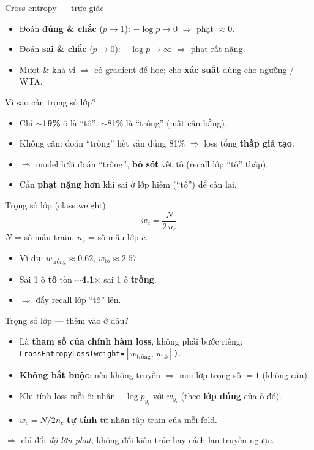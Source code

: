 \documentclass{beamer}
\newcommand{\hl}[1]{\textbf{#1}}
\begin{document}
\begin{frame}{Cross-entropy --- trực giác}
\begin{itemize}
    \item Đoán \hl{đúng \& chắc} ($p\!\to\!1$): $-\log p \to 0$ $\Rightarrow$ phạt $\approx 0$.
    \item Đoán \hl{sai \& chắc} ($p\!\to\!0$): $-\log p \to \infty$ $\Rightarrow$ phạt rất nặng.
    \item Mượt \& khả vi $\Rightarrow$ có gradient để học; cho \hl{xác suất} dùng cho ngưỡng / WTA.
\end{itemize}
\end{frame}

\begin{frame}{Vì sao cần trọng số lớp?}
\begin{itemize}
    \item Chỉ $\sim$\hl{19\%} ô là ``tô'', $\sim$81\% là ``trống'' (mất cân bằng).
    \item Không cân: đoán ``trống'' hết vẫn đúng 81\% $\Rightarrow$ loss tổng \hl{thấp giả tạo}.
    \item $\Rightarrow$ model lười đoán ``trống'', \hl{bỏ sót} vết tô (recall lớp ``tô'' thấp).
    \item Cần \hl{phạt nặng hơn} khi sai ở lớp hiếm (``tô'') để cân lại.
\end{itemize}
\end{frame}

\begin{frame}{Trọng số lớp (class weight)}
\[
w_c=\frac{N}{2\,n_c}
\]
$N$ = số mẫu train, $n_c$ = số mẫu lớp $c$.
\vspace{0.3cm}
\begin{itemize}
    \item Ví dụ: $w_{\text{trống}}\approx 0.62$, $w_{\text{tô}}\approx 2.57$.
    \item Sai 1 ô \hl{tô} tốn $\sim$\hl{4.1$\times$} sai 1 ô \hl{trống}.
    \item $\Rightarrow$ đẩy recall lớp ``tô'' lên.
\end{itemize}
\end{frame}

\begin{frame}{Trọng số lớp --- thêm vào ở đâu?}
\begin{itemize}
    \item Là \hl{tham số của chính hàm loss}, không phải bước riêng: \\[2pt]
          \texttt{CrossEntropyLoss(weight=$[w_{\text{trống}},\,w_{\text{tô}}]$)}.
    \item \hl{Không bắt buộc}: nếu không truyền $\Rightarrow$ mọi lớp trọng số $=1$ (không cân).
    \item Khi tính loss mỗi ô: nhân $-\log p_{y_i}$ với $w_{y_i}$ (theo \hl{lớp đúng} của ô đó).
    \item $w_c=N/2n_c$ \hl{tự tính} từ nhãn tập train của mỗi fold.
\end{itemize}
\vspace{0.15cm}
{\footnotesize $\Rightarrow$ chỉ đổi \emph{độ lớn phạt}, không đổi kiến trúc hay cách lan truyền ngược.}
\end{frame}
\end{document}
